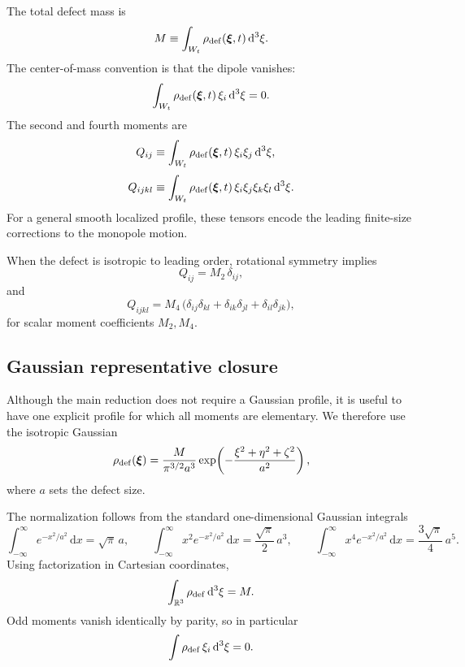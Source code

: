 \documentclass[11pt]{article}
\newcommand{\dd}{\mathrm d}
\begin{document}
The total defect mass is
\begin{equation}
M\equiv \int_{W_t}\rho_{\rm def}(\boldsymbol{\xi},t)\,\dd^3\xi.
\label{eq:app-M-def}
\end{equation}
The center-of-mass convention is that the dipole vanishes:
\begin{equation}
\int_{W_t}\rho_{\rm def}(\boldsymbol{\xi},t)\,\xi_i\,\dd^3\xi=0.
\label{eq:app-dipole-zero}
\end{equation}
The second and fourth moments are
\begin{align}
Q_{ij}
&\equiv
\int_{W_t}\rho_{\rm def}(\boldsymbol{\xi},t)\,\xi_i\xi_j\,\dd^3\xi,
\label{eq:app-Qij}
\\[3pt]
Q_{ijkl}
&\equiv
\int_{W_t}\rho_{\rm def}(\boldsymbol{\xi},t)\,\xi_i\xi_j\xi_k\xi_l\,\dd^3\xi.
\label{eq:app-Qijkl}
\end{align}
For a general smooth localized profile, these tensors encode the leading finite-size
corrections to the monopole motion.

When the defect is isotropic to leading order, rotational symmetry implies
\begin{equation}
Q_{ij}=M_2\,\delta_{ij},
\label{eq:app-Qij-isotropic}
\end{equation}
and
\begin{equation}
Q_{ijkl}
=
M_4\,
\bigl(
\delta_{ij}\delta_{kl}
+
\delta_{ik}\delta_{jl}
+
\delta_{il}\delta_{jk}
\bigr),
\label{eq:app-Qijkl-isotropic}
\end{equation}
for scalar moment coefficients \(M_2,M_4\).

\subsection{Gaussian representative closure}
\label{app:moments-gaussian}

Although the main reduction does not require a Gaussian profile, it is useful to have one
explicit profile for which all moments are elementary. We therefore use the isotropic
Gaussian
\begin{equation}
\rho_{\rm def}(\boldsymbol{\xi})
=
\frac{M}{\pi^{3/2}a^3}
\exp\!\left(-\frac{\xi^2+\eta^2+\zeta^2}{a^2}\right),
\label{eq:app-gaussian-profile}
\end{equation}
where \(a\) sets the defect size.

The normalization follows from the standard one-dimensional Gaussian integrals
\begin{equation}
\int_{-\infty}^{\infty}e^{-x^2/a^2}\,\dd x=\sqrt{\pi}\,a,
\qquad
\int_{-\infty}^{\infty}x^2 e^{-x^2/a^2}\,\dd x=\frac{\sqrt{\pi}}{2}\,a^3,
\qquad
\int_{-\infty}^{\infty}x^4 e^{-x^2/a^2}\,\dd x=\frac{3\sqrt{\pi}}{4}\,a^5.
\label{eq:app-gaussian-1d}
\end{equation}
Using factorization in Cartesian coordinates,
\begin{equation}
\int_{\mathbb R^3}\rho_{\rm def}\,\dd^3\xi=M.
\label{eq:app-gaussian-normalized}
\end{equation}
Odd moments vanish identically by parity, so in particular
\begin{equation}
\int \rho_{\rm def}\,\xi_i\,\dd^3\xi=0.
\label{eq:app-gaussian-dipole}
\end{equation}
\end{document}
